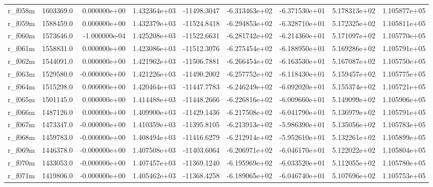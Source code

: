 \documentclass[12pt]{article}
\begin{document}
\begin{landscape}
\begin{longtable}{|l|r|r|r|r|r|r|r|r|}
r\_f058m                 &  1603369.0 &  0.000000e+00 &  1.432364e+03 & -11498.3047 & -6.313463e+02 & -6.371530e+01 &  5.178313e+02 &  1.105877e+05 \\
r\_f059m                 &  1588459.0 &  0.000000e+00 &  1.432379e+03 & -11524.8418 & -6.294853e+02 & -6.328710e+01 &  5.172325e+02 &  1.105811e+05 \\
r\_f060m                 &  1573646.0 & -1.000000e-04 &  1.425208e+03 & -11522.6631 & -6.281742e+02 & -6.214360e+01 &  5.171097e+02 &  1.105770e+05 \\
r\_f061m                 &  1558831.0 &  0.000000e+00 &  1.423086e+03 & -11512.3076 & -6.275454e+02 & -6.188950e+01 &  5.169286e+02 &  1.105791e+05 \\
r\_f062m                 &  1544091.0 &  0.000000e+00 &  1.421962e+03 & -11506.7881 & -6.266454e+02 & -6.163530e+01 &  5.167087e+02 &  1.105750e+05 \\
r\_f063m                 &  1529580.0 & -0.000000e+00 &  1.421226e+03 & -11490.2002 & -6.257752e+02 & -6.118430e+01 &  5.159457e+02 &  1.105775e+05 \\
r\_f064m                 &  1515298.0 &  0.000000e+00 &  1.420464e+03 & -11447.7783 & -6.246249e+02 & -6.092020e+01 &  5.155374e+02 &  1.105721e+05 \\
r\_f065m                 &  1501145.0 &  0.000000e+00 &  1.414488e+03 & -11448.2666 & -6.226816e+02 & -6.009660e+01 &  5.149099e+02 &  1.105906e+05 \\
r\_f066m                 &  1487126.0 &  0.000000e+00 &  1.409900e+03 & -11429.1436 & -6.217508e+02 & -6.041790e+01 &  5.136979e+02 &  1.105791e+05 \\
r\_f067m                 &  1473347.0 & -0.000000e+00 &  1.410359e+03 & -11395.8105 & -6.213913e+02 & -5.986390e+01 &  5.135056e+02 &  1.105783e+05 \\
r\_f068m                 &  1459783.0 & -0.000000e+00 &  1.408494e+03 & -11416.6279 & -6.212914e+02 & -5.952610e+01 &  5.132261e+02 &  1.105899e+05 \\
r\_f069m                 &  1446378.0 & -0.000000e+00 &  1.407508e+03 & -11403.6064 & -6.206971e+02 & -6.046170e+01 &  5.122022e+02 &  1.105804e+05 \\
r\_f070m                 &  1433053.0 & -0.000000e+00 &  1.407457e+03 & -11369.1240 & -6.195969e+02 & -6.033520e+01 &  5.112055e+02 &  1.105780e+05 \\
r\_f071m                 &  1419806.0 & -0.000000e+00 &  1.405462e+03 & -11368.4258 & -6.189065e+02 & -6.046740e+01 &  5.107696e+02 &  1.105753e+05 \\

\end{longtable}
\end{landscape}
\end{document}
